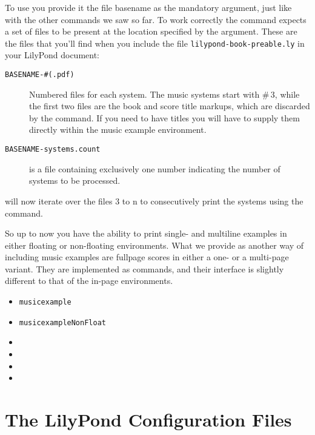 \documentclass[../openLilyLib]{subfiles}
\begin{document}
To use  you provide it the file basename as the mandatory argument, just like with the other commands we saw so far.
To work correctly the command expects a set of files to be present at the location specified by the argument.
These are the files that you'll find when you include the file \texttt{lilypond-book-preable.ly} in your LilyPond document:
\begin{description}
\item[\texttt{BASENAME-\#(.pdf)}] Numbered files for each system.
The music systems start with \#\,3, while the first two files are the book and score title markups, which are discarded by the command.
If you need to have titles you will have to supply them directly within the music example environment.
\item[\texttt{BASENAME-systems.count}] is a file containing exclusively one number indicating the number of systems to be processed.
\end{description}

 will now iterate over the files 3 to n to consecutively print the systems using the  command.


\bigskip
So up to now you have the ability to print single- and multiline examples in either floating or non-floating environments.
What we provide as another way of including music examples are fullpage scores in either a one- or a multi-page variant.
They are implemented as commands, and their interface is slightly different to that of the in-page environments.

\begin{itemize}
\item \texttt{musicexample}
\item \texttt{musicexampleNonFloat}
\item {}
\item {}
\item {}
\item {}
\end{itemize}

\section{The LilyPond Configuration Files}
\label{sec:lilypond-configuration}
\end{document}
